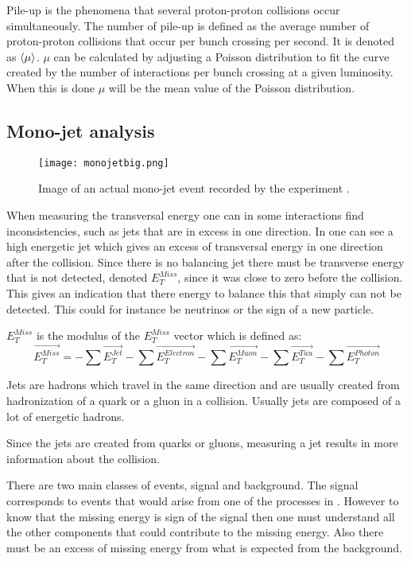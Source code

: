 Pile-up is the phenomena that several proton-proton collisions occur simultaneously. The number of pile-up is defined as the average number of proton-proton collisions that occur per bunch crossing per second. It is denoted as $\left<\mu\right>$. $\mu$ can be calculated by adjusting a Poisson distribution to fit the curve created by the number of interactions per bunch crossing at a given luminosity. When this is done $\mu$ will be the mean value of the Poisson distribution.


\subsection{Mono-jet analysis}\label{sec:eo:subsec:mjet}

\begin{figure}[ht]
\texttt{[image: monojetbig.png]}
\caption{Image of an actual mono-jet event recorded by the \abbrATLAS experiment \citep{monojet}.}
\label{fig:monojet}
\end{figure}

When measuring the transversal energy one can in some interactions find inconsistencies, such as jets that are in excess in one direction. In  one can see a high energetic jet which gives an excess of transversal energy in one direction after the collision. Since there is no balancing jet there must be transverse energy that is not detected, denoted $E_T^{Miss}$, since it was close to zero before the collision. This gives an indication that there energy to balance this that simply can not be detected. This could for instance be neutrinos or the sign of a new particle.

$E_T^{Miss}$ is the modulus of the $E_T^{Miss}$ vector which is defined as:
\begin{equation}\label{eq:etmiss}
\vec{E_T^{Miss}} = - \sum \vec{E_T^{Jet}} - \sum \vec{E_T^{Electron}} - \sum \vec{E_T^{Muon}} - \sum \vec{E_T^{Tau}} - \sum \vec{E_T^{Photon}}
\end{equation}  

Jets are hadrons which travel in the same direction and are usually created from hadronization of a quark or a gluon in a collision. Usually jets are composed of a lot of energetic hadrons.

Since the jets are created from quarks or gluons, measuring a jet results in more information about the collision.

There are two main classes of events, signal and background. 
The signal corresponds to events that would arise from one of the processes in . However to know that the missing energy is sign of the signal then one must understand all the other components that could contribute to the missing energy. Also there must be an excess of missing energy from what is expected from the background.


